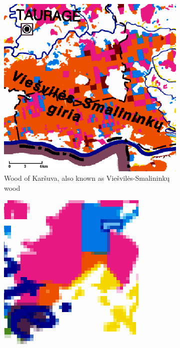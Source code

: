 \documentclass[a4paper,12pt]{scrbook}
\begin{document}
\begin{figure}
  \centering
  \begin{subfigure}[t]{0.49\textwidth}
    \includegraphics[width=\textwidth]{thesis-figures/karsuva-atlas}
    \caption{Wood of Kar\v{s}uva, also known as Vie\v{s}vil\.{e}s-Smalinink\k{u} wood}
  \end{subfigure} \hfill
  \begin{subfigure}[t]{0.45\textwidth}
    \includegraphics[width=\textwidth]{thesis-figures/medziokalnis-atlas}

\end{subfigure}
\end{figure}
\end{document}
